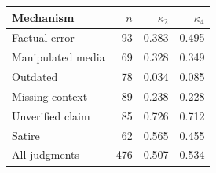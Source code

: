 \begin{tabular}{@{}lrrr@{}}
\toprule
Mechanism & $n$ & $\kappa_2$ & $\kappa_4$ \\
\midrule
Factual error & 93 & 0.383 & 0.495 \\
Manipulated media & 69 & 0.328 & 0.349 \\
Outdated & 78 & 0.034 & 0.085 \\
Missing context & 89 & 0.238 & 0.228 \\
Unverified claim & 85 & 0.726 & 0.712 \\
Satire & 62 & 0.565 & 0.455 \\
\midrule
All judgments & 476 & 0.507 & 0.534 \\
\bottomrule
\end{tabular}
